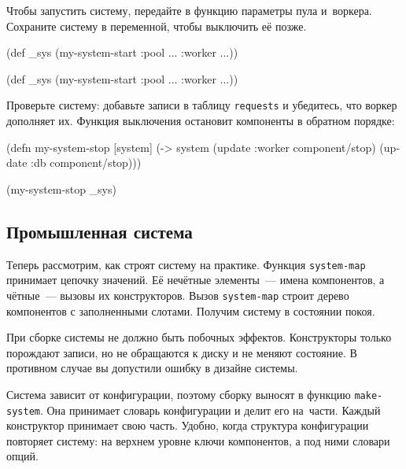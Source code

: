 Чтобы запустить систему, передайте в функцию параметры пула и~воркера. Сохраните
систему в переменной, чтобы выключить её позже.

\ifnarrow

\begin{english}
  \begin{clojure}
(def _sys
  (my-system-start
    {:pool {...} :worker {...}}))
  \end{clojure}
\end{english}

\else

\begin{english}
  \begin{clojure}
(def _sys (my-system-start {:pool {...} :worker {...}}))
  \end{clojure}
\end{english}

\fi

Проверьте систему: добавьте записи в таблицу \verb|requests| и убедитесь, что
воркер дополняет их. Функция выключения остановит компоненты в обратном порядке:

\begin{english}
  \begin{clojure}
(defn my-system-stop
  [system]
  (-> system
      (update :worker component/stop)
      (update :db component/stop)))

(my-system-stop _sys)
  \end{clojure}
\end{english}

\subsection{Промышленная система}


Теперь рассмотрим, как строят систему на практике. Функция \verb|system-map|
принимает цепочку значений. Её нечётные элементы~--- имена компонентов, а
чётные~--- вызовы их конструкторов. Вызов \verb|system-map| строит дерево
компонентов с заполненными слотами. Получим систему в состоянии покоя.


При сборке системы не должно быть побочных эффектов. Конструкторы только
порождают записи, но не обращаются к диску и не меняют состояние. В противном
случае вы допустили ошибку в дизайне системы.

Система зависит от конфигурации, поэтому сборку выносят в функцию
\verb|make-system|. Она принимает словарь конфигурации и делит его
на~части. Каждый конструктор принимает свою часть. Удобно, когда структура
конфигурации повторяет систему: на верхнем уровне ключи компонентов, а под ними
словари опций.

